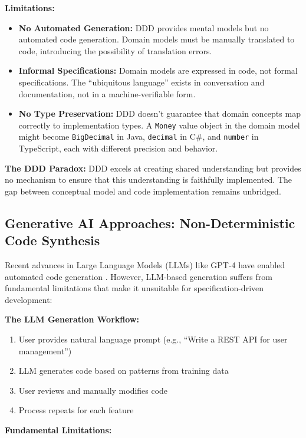 \textbf{Limitations:}

\begin{itemize}
    \item \textbf{No Automated Generation:} DDD provides mental models but no automated code generation. Domain models must be manually translated to code, introducing the possibility of translation errors.
    \item \textbf{Informal Specifications:} Domain models are expressed in code, not formal specifications. The ``ubiquitous language'' exists in conversation and documentation, not in a machine-verifiable form.
    \item \textbf{No Type Preservation:} DDD doesn't guarantee that domain concepts map correctly to implementation types. A \texttt{Money} value object in the domain model might become \texttt{BigDecimal} in Java, \texttt{decimal} in C\#, and \texttt{number} in TypeScript, each with different precision and behavior.
\end{itemize}

\textbf{The DDD Paradox:} DDD excels at creating shared understanding but provides no mechanism to ensure that this understanding is faithfully implemented. The gap between conceptual model and code implementation remains unbridged.

\subsection{Generative AI Approaches: Non-Deterministic Code Synthesis}

Recent advances in Large Language Models (LLMs) like GPT-4 have enabled automated code generation \cite{gpt4-2023}. However, LLM-based generation suffers from fundamental limitations that make it unsuitable for specification-driven development:

\textbf{The LLM Generation Workflow:}
\begin{enumerate}
    \item User provides natural language prompt (e.g., ``Write a REST API for user management'')
    \item LLM generates code based on patterns from training data
    \item User reviews and manually modifies code
    \item Process repeats for each feature
\end{enumerate}

\textbf{Fundamental Limitations:}

